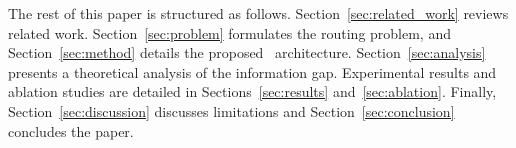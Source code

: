 The rest of this paper is structured as follows. Section~\ref{sec:related_work} reviews related work. Section~\ref{sec:problem} formulates the routing problem, and Section~\ref{sec:method} details the proposed \method\ architecture. Section~\ref{sec:analysis} presents a theoretical analysis of the information gap. Experimental results and ablation studies are detailed in Sections~\ref{sec:results} and~\ref{sec:ablation}. Finally, Section~\ref{sec:discussion} discusses limitations and Section~\ref{sec:conclusion} concludes the paper.

